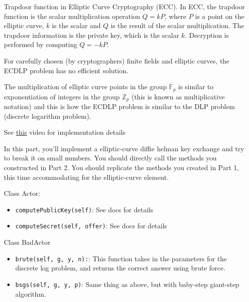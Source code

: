\documentclass{article}
\begin{document}
    \vspace{3mm}
    Trapdoor function in Elliptic Curve Cryptography (ECC). In ECC, the trapdoor function is the scalar multiplication operation $Q = kP$, where $P$ is a point on the elliptic curve, $k$ is the scalar and $Q$ is the result of the scalar multiplication. The trapdoor information is the private key, which is the scalar $k$. Decryption is performed by computing $Q = -kP$.


For carefully chosen (by cryptographers) finite fields and elliptic curves, the ECDLP problem has no efficient solution.

The multiplication of elliptic curve points in the group $\mathbb{F}_{p}$ is similar to exponentiation of integers in the group $\mathbb{Z}_{p}$ (this is known as multiplicative notation) and this is how the ECDLP problem is similar to the DLP problem (discrete logarithm problem).

See \href{https://www.youtube.com/watch?v=gAtBM06xwaw}{this} video for implementation details

\begin{tcolorbox}
    In this part, you'll implement a elliptic-curve diffie helman key exchange and try to break it on small numbers. You should directly call the methods you constructed in Part 2. You should replicate the methods you created in Part 1, this time accommodating for the elliptic-curve element.

    Class Actor:
    \begin{itemize}
        \item \lstinline{computePublicKey(self)}: See docs for details
        \item \lstinline{computeSecret(self, offer)}: See docs for details
    \end{itemize}

    Class BadActor
    \begin{itemize}
        \item \lstinline{brute(self, g, y, n):}: This function takes in the parameters for the discrete log problem, and returns the correct answer using brute force.
        \item \lstinline{bsgs(self, g, y, p)}: Same thing as above, but with baby-step giant-step algorithm.
    \end{itemize}
\end{tcolorbox}


\end{document}

